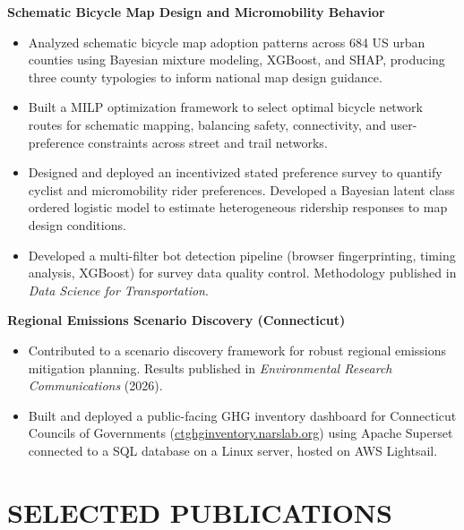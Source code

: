 \documentclass[10pt, a4paper]{article}
\begin{document}
\vspace{4pt}
\textbf{Schematic Bicycle Map Design and Micromobility Behavior}
\begin{itemize}
  \item Analyzed schematic bicycle map adoption patterns across 684 US urban counties using Bayesian mixture modeling, XGBoost, and SHAP, producing three county typologies to inform national map design guidance.
  \item Built a MILP optimization framework to select optimal bicycle network routes for schematic mapping, balancing safety, connectivity, and user-preference constraints across street and trail networks.
  \item Designed and deployed an incentivized stated preference survey to quantify cyclist and micromobility rider preferences. Developed a Bayesian latent class ordered logistic model to estimate heterogeneous ridership responses to map design conditions.
  \item Developed a multi-filter bot detection pipeline (browser fingerprinting, timing analysis, XGBoost) for survey data quality control. Methodology published in \textit{Data Science for Transportation}.
\end{itemize}

\vspace{4pt}
\textbf{Regional Emissions Scenario Discovery (Connecticut)}
\begin{itemize}
  \item Contributed to a scenario discovery framework for robust regional emissions mitigation planning. Results published in \textit{Environmental Research Communications} (2026).
  \item Built and deployed a public-facing GHG inventory dashboard for Connecticut Councils of Governments (\href{https://ctghginventory.narslab.org}{ctghginventory.narslab.org}) using Apache Superset connected to a SQL database on a Linux server, hosted on AWS Lightsail.
\end{itemize}

\section{SELECTED PUBLICATIONS}

\end{document}
